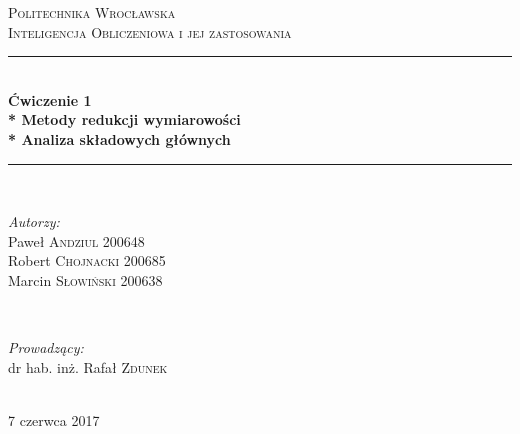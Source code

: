 \begin{titlepage}

\newcommand{\HRule}{\rule{\linewidth}{0.5mm}} 
\center 

\textsc{\LARGE Politechnika Wrocławska}\\[1.5cm] 
\textsc{\Large Inteligencja Obliczeniowa i jej zastosowania}\\[0.5cm] 
\HRule \\[0.5cm]
{ \huge \bfseries Ćwiczenie 1 \\*
	Metody redukcji wymiarowości \\*
	Analiza składowych głównych}\\[0.5cm] 
\HRule \\[1.6cm]
 
\begin{minipage}{0.4\textwidth}
\begin{flushleft} \large
\emph{Autorzy:}\\
Paweł  \textsc{Andziul} 200648 \\
Robert  \textsc{Chojnacki} 200685 \\
Marcin  \textsc{Słowiński} 200638 \\
\end{flushleft}
\end{minipage}
~
\begin{minipage}{0.4\textwidth}
\begin{flushright} \large
\emph{Prowadzący:} \\
dr hab. inż. Rafał \textsc{Zdunek}
\end{flushright}
\end{minipage}\\[4cm]

\vfill 
{\large 7 czerwca 2017}\\[3cm] 

\end{titlepage}